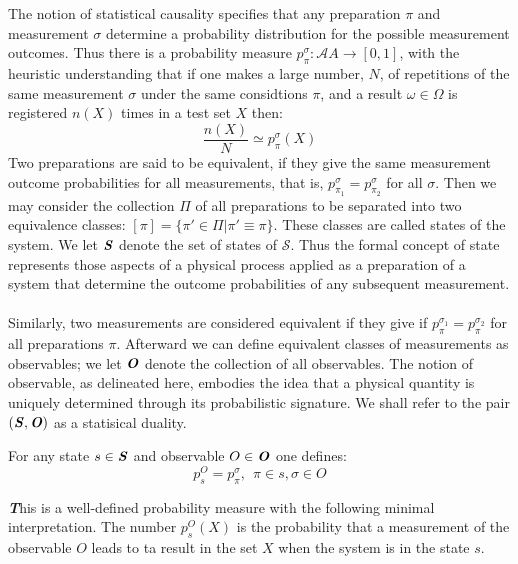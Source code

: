 \documentclass[10pt]{article}
\newcounter{theo}
\newenvironment{callout}
	{\begin{calloutbox}\color{charcoal}\textbf\textit}
	{\end{calloutbox}}
\newcommand{\sys}{\mathcal{S}}
\newcommand{\m}{\mathcal{A}}
\newcommand{\state}{\textbf{\textit{S}}}
\newcommand{\observable}{\textbf{\textit{O}}}
\begin{document}
    \\
    \\
    The notion of statistical causality specifies that any preparation $\pi$ and measurement $\sigma$ determine a probability distribution for the possible measurement outcomes. Thus there is a probability measure $p_\pi^\sigma:\m{A}\rightarrow [0,1]$, with the heuristic understanding that if one makes a large number, $N$, of repetitions of the same measurement $\sigma$ under the same considtions $\pi$, and a result $\omega\in \Omega$ is registered $n(X)$ times in a test set $X$ then:
    \begin{equation}
        \frac{n(X)}{N}\simeq p_\pi^\sigma(X)
    \end{equation}
    \indent Two preparations are said to be equivalent, if they give the same measurement outcome probabilities for all measurements, that is, $p_{\pi_1}^\sigma = p_{\pi_2}^{\sigma}$ for all $\sigma$. Then we may consider the collection $\Pi$ of all preparations to be separated into two equivalence classes: $[\pi] = \{\pi'\in \Pi | \pi'\equiv \pi\}$. These classes are called states of the system. We let $\state$ denote the set of states of $\sys$. Thus the formal concept of state represents those aspects of a physical process applied as a preparation of a system that determine the outcome probabilities of any subsequent measurement.
    \\
    \\
    \indent Similarly, two measurements are considered equivalent if they give if $p_\pi^{\sigma_1} = p_\pi^{\sigma_2}$ for all preparations $\pi$. Afterward we can define equivalent classes of measurements as observables; we let $\observable$ denote the collection of all observables. The notion of observable, as delineated here, embodies the idea that a physical quantity is uniquely determined through its probabilistic signature. We shall refer to the pair $(\state,\observable)$ as a statisical duality.
    \begin{theobox}
        For any state $s\in\state$ and observable $O\in\observable$ one defines:
        \begin{equation}
            p_s^O = p_\pi^\sigma, \ \ \pi\in s, \sigma\in O
        \end{equation}
    \end{theobox}
    \begin{callout}
        This is a well-defined probability measure with the following minimal interpretation. The number $p_s^O(X)$ is the probability that a measurement of the observable $O$ leads to ta result in the set $X$ when the system is in the state $s$.
    \end{callout}
\end{document}
